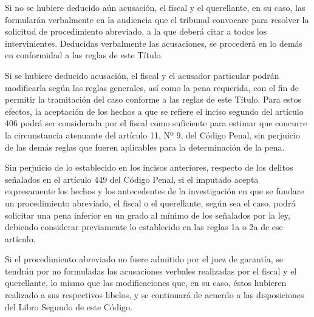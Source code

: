     Si no se hubiere deducido aún acusación, el fiscal y el querellante, en su caso, las formularán verbalmente en la audiencia que el tribunal convocare para resolver la solicitud de procedimiento abreviado, a la que deberá citar a todos los intervinientes. Deducidas verbalmente las acusaciones, se procederá en lo demás en conformidad a las reglas de este Título.

      Si se hubiere deducido acusación, el fiscal y el acusador particular podrán modificarla según las reglas generales, así como la pena requerida, con el fin de permitir la tramitación del caso conforme a las reglas de este Título. Para estos efectos, la aceptación de los hechos a que se refiere el inciso segundo del artículo 406 podrá ser considerada por el fiscal como suficiente para estimar que concurre la circunstancia atenuante del artículo 11, Nº 9, del Código Penal, sin perjuicio de las demás reglas que fueren aplicables para la determinación de la pena.

    Sin perjuicio de lo establecido en los incisos anteriores, respecto de los delitos señalados en el artículo 449 del Código Penal, si el imputado acepta expresamente los hechos y los antecedentes de la investigación en que se fundare un procedimiento abreviado, el fiscal o el querellante, según sea el caso, podrá solicitar una pena inferior en un grado al mínimo de los señalados por la ley, debiendo considerar previamente lo establecido en las reglas 1a o 2a de ese artículo.

    Si el procedimiento abreviado no fuere admitido por el juez de garantía, se tendrán por no formuladas las acusaciones verbales realizadas por el fiscal y el querellante, lo mismo que las modificaciones que, en su caso, éstos hubieren realizado a sus respectivos libelos, y se continuará de acuerdo a las disposiciones del Libro Segundo de este Código.



